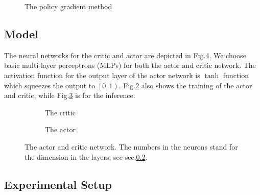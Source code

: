 \documentclass{article}
\begin{document}
\begin{figure}[ht]
	\centering
	\def\svgwidth{0.8\columnwidth}
	
	\caption{\label{fig:rl_model} The policy gradient method}\label{fig:policy gradient}
\end{figure}

\subsection{Model}\label{sec:model}

The neural networks for the critic and actor are depicted in Fig.\@\ref{fig:actorcritic}. We choose basic multi-layer perceptrons (MLPs) for both the actor and critic network. The activation function for the output layer of the actor network is $\tanh$ function which squeezes the output to $\left[0,1\right)$. Fig.\@\ref{fig:critic} also shows the training of the actor and critic, while Fig.\@\ref{fig:actor} is for the inference.

\begin{figure}[ht]
	\centering
	\begin{subfigure}[b]{0.55\textwidth}
		\centering
		\def\svgwidth{\columnwidth}
		
		\caption{\label{fig:critic} The critic}
	\end{subfigure}
	\hfill
	\begin{subfigure}[b]{0.4\textwidth}
		\centering
		\def\svgwidth{\columnwidth}
		
		\caption{\label{fig:actor} The actor}
	\end{subfigure}
	\caption{The actor and critic network. The numbers in the neurons stand for the dimension in the layers, see sec.\@\ref{sec:setup}.}\label{fig:actorcritic}
\end{figure}


%	
%	


\subsection{Experimental Setup}\label{sec:setup}
\end{document}
